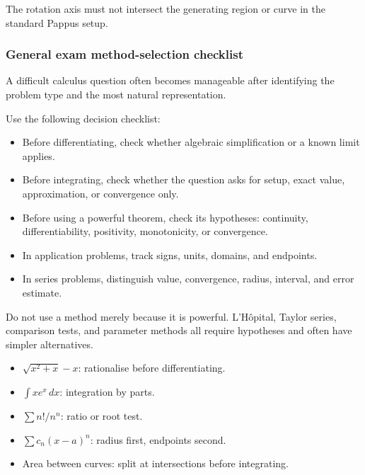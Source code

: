 \begin{commonmistake}
The rotation axis must not intersect the generating region or curve in the
standard Pappus setup.
\end{commonmistake}

\newpage
\subsubsection{General exam method-selection checklist}
\begin{extension}
A difficult calculus question often becomes manageable after identifying the
problem type and the most natural representation.
\end{extension}

\begin{examtip}
Use the following decision checklist:
\begin{itemize}[leftmargin=*]
\item Before differentiating, check whether algebraic simplification or a known limit applies.
\item Before integrating, check whether the question asks for setup, exact value, approximation, or convergence only.
\item Before using a powerful theorem, check its hypotheses: continuity, differentiability, positivity, monotonicity, or convergence.
\item In application problems, track signs, units, domains, and endpoints.
\item In series problems, distinguish value, convergence, radius, interval, and error estimate.
\end{itemize}
\end{examtip}

\begin{commonmistake}
Do not use a method merely because it is powerful.  L'H\^opital, Taylor series,
comparison tests, and parameter methods all require hypotheses and often have
simpler alternatives.
\end{commonmistake}

\begin{examplebox}[title={Method Choice Examples}]
\begin{itemize}[leftmargin=*]
\item \(\sqrt{x^2+x}-x\): rationalise before differentiating.
\item \(\int x e^{x}\,dx\): integration by parts.
\item \(\sum n!/n^n\): ratio or root test.
\item \(\sum c_n(x-a)^n\): radius first, endpoints second.
\item Area between curves: split at intersections before integrating.
\end{itemize}
\end{examplebox}
